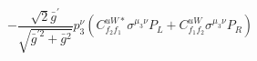 %
\begin{dmath*}
%
  -  \frac{\sqrt{2} {\bar g}^\prime}{\sqrt{{\bar g}^{\prime 2} + {\bar g}{}^2}} p_3^{\nu} \left(C^{uW*}_{f_2 f_1} \sigma^{\mu_3 \nu } P_L  + C^{uW}_{f_1 f_2} \sigma^{\mu_3 \nu } P_R \right)
%
\end{dmath*}
%

